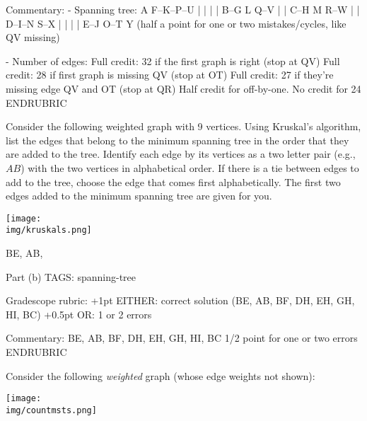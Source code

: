\begin{parts}
Commentary:
- Spanning tree:
  A  F--K--P--U
  |  |  |  |
  B--G  L  Q--V
        |  |
  C--H  M  R--W
     |  |
  D--I--N  S--X
  |     |  |  |
  E--J  O--T  Y
    (half a point for one or two mistakes/cycles, like QV missing)

- Number of edges:
  Full credit: 32 if the first graph is right (stop at QV)
  Full credit: 28 if first graph is missing QV (stop at OT)
  Full credit: 27 if they're missing edge QV and OT (stop at QR)
  Half credit for off-by-one.
  No credit for 24
ENDRUBRIC


\newpage
{}%
%
Consider the following weighted graph with 9 vertices. Using Kruskal's
algorithm, list the edges that belong to the minimum spanning tree in
the order that they are added to the tree. Identify each edge by its
vertices as a two letter pair (e.g., $AB$) with the two vertices in
alphabetical order.  If there is a tie between edges to add to the
tree, choose the edge that comes first alphabetically. The first two
edges added to the minimum spanning tree are given for you.

\medskip
\begin{center}
\texttt{[image: \\img/kruskals.png]}
\end{center}

\medskip
\begin{framed}
\medskip
BE, AB, 
\end{framed}

\RUBRIC
Part (b)
TAGS: spanning-tree

Gradescope rubric:
+1pt   EITHER: correct solution (BE, AB, BF, DH, EH, GH, HI, BC)
+0.5pt     OR: 1 or 2 errors

Commentary:
  BE, AB, BF, DH, EH, GH, HI, BC
    1/2 point for one or two errors
ENDRUBRIC

\bigskip
{}%
%
Consider the following \emph{weighted} graph (whose edge weights not shown):

\begin{center}
\texttt{[image: \\img/countmsts.png]}
\end{center}


\end{parts}
